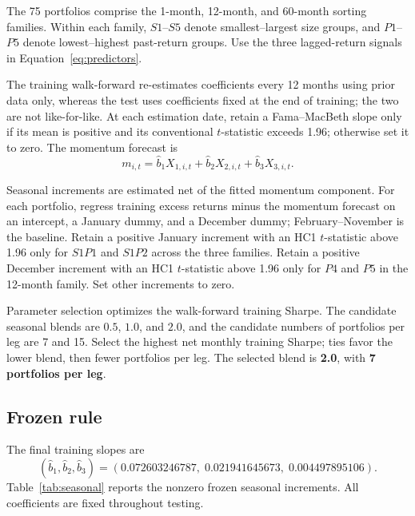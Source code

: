 \documentclass[11pt]{article}
\begin{document}
The 75 portfolios comprise the 1-month, 12-month, and 60-month sorting families.
Within each family, $S1$--$S5$ denote smallest--largest size groups, and
$P1$--$P5$ denote lowest--highest past-return groups. Use the three lagged-return
signals in Equation~\eqref{eq:predictors}.

The training walk-forward re-estimates coefficients every 12 months using prior
data only, whereas the test uses coefficients fixed at the end of training; the
two are not like-for-like. At each estimation date, retain a Fama--MacBeth slope
only if its mean is positive and its conventional $t$-statistic exceeds 1.96;
otherwise set it to zero. The momentum forecast is
\begin{equation}
 m_{i,t}=\widehat b_1X_{1,i,t}+\widehat b_2X_{2,i,t}
                              +\widehat b_3X_{3,i,t}.
 \label{eq:momentum}
\end{equation}

Seasonal increments are estimated net of the fitted momentum component.
For each portfolio, regress training excess returns minus the momentum forecast
on an intercept, a January dummy, and a December dummy; February--November is
the baseline. Retain a positive January increment with an HC1 $t$-statistic
above 1.96 only for $S1P1$ and $S1P2$ across the three families. Retain a positive
December increment with an HC1 $t$-statistic above 1.96 only for $P4$ and $P5$
in the 12-month family. Set other increments to zero.

Parameter selection optimizes the walk-forward training Sharpe. The candidate
seasonal blends are $0.5$, $1.0$, and $2.0$, and the candidate numbers of
portfolios per leg are 7 and 15. Select the highest net monthly training Sharpe;
ties favor the lower blend, then fewer portfolios per leg. The selected blend is
\textbf{2.0}, with \textbf{7 portfolios per leg}.

\subsection*{Frozen rule}

The final training slopes are
\begin{equation}
 (\widehat b_1,\widehat b_2,\widehat b_3)
 =(0.072603246787,\;0.021941645673,\;0.004497895106).
 \label{eq:frozen-slopes}
\end{equation}
Table~\ref{tab:seasonal} reports the nonzero frozen seasonal increments.
All coefficients are fixed throughout testing.
\end{document}

